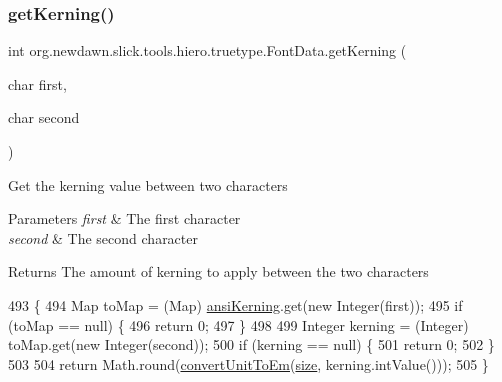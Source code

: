 \subsubsection{\texorpdfstring{get\+Kerning()}{getKerning()}}
{\footnotesize\ttfamily int org.\+newdawn.\+slick.\+tools.\+hiero.\+truetype.\+Font\+Data.\+get\+Kerning (\begin{DoxyParamCaption}\item[{char}]{first,  }\item[{char}]{second }\end{DoxyParamCaption})\hspace{0.3cm}{\ttfamily [inline]}}

Get the kerning value between two characters


\begin{DoxyParams}{Parameters}
{\em first} & The first character \\
\hline
{\em second} & The second character \\
\hline
\end{DoxyParams}
\begin{DoxyReturn}{Returns}
The amount of kerning to apply between the two characters 
\end{DoxyReturn}

\begin{DoxyCode}
493                                                    \{
494         Map toMap = (Map) \mbox{\hyperlink{classorg_1_1newdawn_1_1slick_1_1tools_1_1hiero_1_1truetype_1_1_font_data_ab28272a83e0e9aa3836fbc5f7d913801}{ansiKerning}}.get(\textcolor{keyword}{new} Integer(first));
495         \textcolor{keywordflow}{if} (toMap == null) \{
496             \textcolor{keywordflow}{return} 0;
497         \}
498         
499         Integer kerning = (Integer) toMap.get(\textcolor{keyword}{new} Integer(second));
500         \textcolor{keywordflow}{if} (kerning == null) \{
501             \textcolor{keywordflow}{return} 0;
502         \}
503         
504         \textcolor{keywordflow}{return} Math.round(\mbox{\hyperlink{classorg_1_1newdawn_1_1slick_1_1tools_1_1hiero_1_1truetype_1_1_font_data_ae82293147d863b46f9c3d52cfc75771b}{convertUnitToEm}}(\mbox{\hyperlink{classorg_1_1newdawn_1_1slick_1_1tools_1_1hiero_1_1truetype_1_1_font_data_a96af538e2a7368fdba46ffc2ad6a9a0e}{size}}, kerning.intValue()));
505     \}
\end{DoxyCode}
\mbox{\label{classorg_1_1newdawn_1_1slick_1_1tools_1_1hiero_1_1truetype_1_1_font_data_a68cb4ad825dd0c861f8019e47319b6a1}} 

